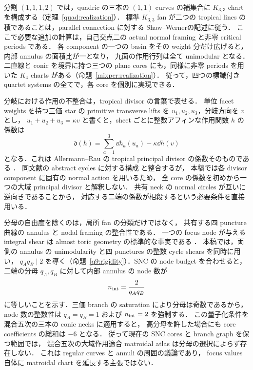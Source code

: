 分割 $(1,1,1,2)$ では，quadric の三本の $(1,1)$ curves の補集合に
$K_{3,3}$ chart を構成する（定理~\ref{quad:realization}）．
標準 $K_{3,3}$ fan が二つの tropical lines の積であることは，parallel connection に対する
Shaw--Werner\cite[Theorem~7.2]{ShawWerner}の記述に従う．
ここで必要な追加の計算は，自己交点二の actual normal framing と非零 critical periods である．
各 component の一つの basin をその weight 分だけ広げると，内部 annulus の面積比が一となり，
九面の作用行列は全て unimodular となる．
二直線と conic を境界に持つ三つの plane cores にも，同様に非零 periods を用いた
$K_4$ charts がある（命題~\ref{mixper:realization}）．
従って，四つの標識付き quartet systems の全てで，各 core を個別に実現できる．

分岐における作用の不整合は，tropical divisor の言葉で表せる．
単位 facet weights を持つ三価 star の primitive transverse lifts を
$u_1,u_2,u_3$，分岐方向を $v$ とし，
$u_1+u_2+u_3=\kappa v$ と書くと，sheet ごとに整数アフィンな作用関数 $h$ の係数は
\[
 \mathfrak d(h)=\sum_{a=1}^3\dd h_a(u_a)-\kappa\dd h(v)
\]
となる．これは Allermann--Rau の tropical principal divisor の係数そのものである
\cite[Definition~3.4, Remark~3.5]{AllermannRau}．
同文献の abstract cycles に対する構成
\cite[Definition~6.1, Construction~6.4]{AllermannRau}と整合するが，
本稿では各 divisor component に固有の normal action を用いるため，
全 core の係数を初めから一つの大域 principal divisor と解釈しない．
共有 neck の normal circles が互いに逆向きであることから，
対応する二端の係数が相殺するという必要条件を直接用いる．

分母の自由度を除くのは，局所 fan の分類だけではなく，
共有する四 puncture 曲線の annulus と nodal framing の整合性である．
一つの focus node が与える integral shear は almost toric geometry の標準的な事実である
\cite[\S4.3, equation~(4.10)]{SymingtonFour}．
本稿では，両側の annulus の unimodularity と四 punctures の整数 cycle shears を同時に用い，
$q_Aq_B\mid2$ を導く（命題~\ref{q9:rigidity}）．SNC の node budget を合わせると，
二端の分母 $q_A,q_B$ に対して内部 annulus の node 数が
\[
 n_{\rm int}=\frac{2}{q_Aq_B}
\]
に等しいことを示す．三価 branch の saturation により分母は奇数であるから，
node 数の整数性は $q_A=q_B=1$ および $n_{\rm int}=2$ を強制する．
この量子化条件を混合五次の三本の conic necks に適用すると，
高分母を許した場合にも core coefficients の総和は $-6$ となる．
従って現在の SNC cores と branch graph を保つ範囲では，
混合五次の大域作用適合 matroidal atlas は分母の選択によらず存在しない．
これは regular curves と annuli の周囲の議論であり，
focus values 自体に matroidal chart を延長する主張ではない．

